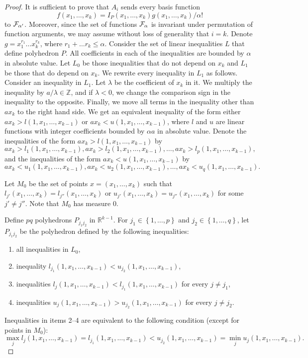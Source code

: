 \documentclass[11pt]{article}
\newcommand {\set}   [1] {\left\{ #1 \right\}}
\newcommand {\bbZ}    {\mathbb{Z}}
\newcommand {\bbR}    {\mathbb{R}}
\newcommand {\calF}   {{\cal{F}}}
\begin{document}
\begin{proof}
It is sufficient to prove that $A_i$ sends every basis function
$$f(x_1,\dots, x_k) = I_P(x_1,\dots,x_k) g(x_1,\dots,x_k)/\alpha!$$ to $\calF_{\alpha'}$.
Moreover, since the set of functions $\calF_{\alpha}$ is invariant under permutation of function arguments, we may assume without loss of generality that $i = k$.
Denote $g = x_1^{r_1} \dots x_k^{r_k}$, where $r_1 + \dots r_k \leq \alpha$.
Consider the set of linear inequalities $L$ that define polyhedron $P$. All coefficients in each of the inequalities are bounded by $\alpha$ in absolute value.
Let $L_0$ be those inequalities that do not depend on $x_k$ and $L_1$ be those that do depend on $x_k$.
We rewrite every inequality in $L_1$ as follows. Consider an inequality in $L_1$. Let $\lambda$ be the coefficient of $x_k$ in it.
We multiply the inequality by $a/\lambda \in \bbZ$, and if $\lambda < 0$, we change the comparison sign in the inequality to the opposite.
Finally, we move all terms in the inequality other than $a x_k$ to the right hand side.
We get an equivalent inequality of the form either $a x_k > l(1,x_1,\dots, x_{k-1})$ or $a x_k < u(1,x_1,\dots, x_{k-1})$,
where $l$ and $u$ are linear functions with integer coefficients bounded by $\alpha a$ in absolute value.
Denote the inequalities of the form $a x_k > l(1,x_1,\dots, x_{k-1})$ by
$$a x_k > l_1(1,x_1,\dots, x_{k-1}), a x_k > l_2(1,x_1,\dots, x_{k-1}),\dots, a x_k > l_p(1,x_1,\dots, x_{k-1}),$$
and the inequalities of the form $a x_k < u(1,x_1,\dots, x_{k-1})$ by
$$a x_k < u_1(1,x_1,\dots, x_{k-1}), a x_k < u_2(1,x_1,\dots, x_{k-1}),\dots, a x_k < u_q(1,x_1,\dots, x_{k-1}).$$

Let $M_0$ be the set of points $x = (x_1,\dots, x_k)$ such that
$l_{j'} (x_1,\dots, x_k) = l_{j''} (x_1,\dots, x_k)$ or $u_{j'} (x_1,\dots, x_k) = u_{j''} (x_1,\dots, x_k)$
for some $j' \neq j''$. Note that $M_0$ has measure $0$.

Define $pq$ polyhedrons $P_{j_1j_2}$ in $\bbR^{k-1}$. For $j_1\in\set{1,\dots,p}$ and $j_2\in\set{1,\dots,q}$, let $P_{j_1j_2}$ be the
polyhedron defined by the following inequalities:
\begin{enumerate}
\item all inequalities in $L_0$,
\item inequality $l_{j_1}(1,x_1,\dots,x_{k-1}) < u_{j_2}(1,x_1,\dots,x_{k-1})$,
\item inequalities $l_j(1,x_1,\dots,x_{k-1}) < l_{j_1}(1,x_1,\dots,x_{k-1})$ for every $j\neq j_1$,
\item inequalities $u_j(1,x_1,\dots,x_{k-1}) > u_{j_2}(1,x_1,\dots,x_{k-1})$ for every $j\neq j_2$.
\end{enumerate}
Inequalities in items 2--4 are equivalent to the following condition (except for points in $M_0$):
\begin{equation}\label{ineq:Pjj-constraints}
\max_j l_j(1,x_1,\dots,x_{k-1}) = l_{j_1}(1,x_1,\dots,x_{k-1}) < u_{j_2}(1,x_1,\dots,x_{k-1}) = \min_j u_{j}(1,x_1,\dots,x_{k-1}).
\end{equation}


\end{proof}
\end{document}
